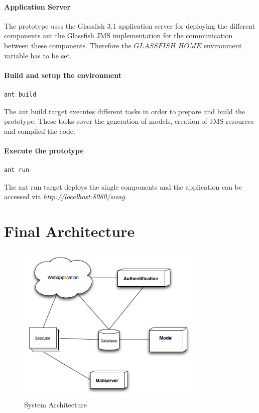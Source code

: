 \documentclass[a4paper]{article}
\begin{document}
\paragraph{Application Server}
The prototype uses the Glassfish 3.1 application server for deploying the different components ant the Glassfish JMS implementation for the communication between these components. Therefore the $GLASSFISH\_HOME$ environment variable has to be set.

\paragraph{Build and setup the environment}
\begin{verbatim}
ant build
\end{verbatim}

The ant build target executes different tasks in order to prepare and build the prototype. These tasks cover the generation of models, creation of JMS resources and compiled the code. 



\paragraph{Execute the prototype}
\begin{verbatim}
ant run
\end{verbatim}

The ant run target deploys the single components and the application can be accessed via \emph{http://localhost:8080/swag}.



\section{Final Architecture}

\begin{figure}[htb]
\begin{center}
\leavevmode
\includegraphics[width=0.8\textwidth]{Arch.png}
\end{center}
\caption{System Architecture}
\end{figure}
\end{document}
